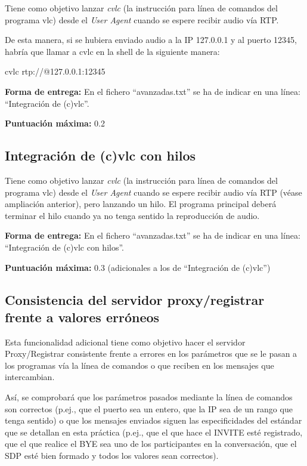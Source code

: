 \documentclass[a4paper,11pt]{article}
\begin{document}
Tiene como objetivo lanzar \emph{cvlc} (la instrucción para línea de comandos del programa vlc) desde el \emph{User Agent} cuando se espere recibir audio vía RTP.

De esta manera, si se hubiera enviado audio a la IP 127.0.0.1 y al puerto 12345, habría que llamar a cvlc en la shell de la siguiente manera:

cvlc rtp://@127.0.0.1:12345

  {\bf Forma de entrega:} En el fichero ``avanzadas.txt'' se ha de indicar en una línea: ``Integración de (c)vlc''.

  {\bf Puntuación máxima:} 0.2

\subsection*{Integración de (c)vlc con hilos}

Tiene como objetivo lanzar \emph{cvlc} (la instrucción para línea de comandos del programa vlc) desde el \emph{User Agent} cuando se espere recibir audio vía RTP (véase ampliación anterior), pero lanzando un hilo. El programa principal deberá terminar el hilo cuando ya no tenga sentido la reproducción de audio.

  {\bf Forma de entrega:} En el fichero ``avanzadas.txt'' se ha de indicar en una línea: ``Integración de (c)vlc con hilos''.

  {\bf Puntuación máxima:} 0.3 (adicionales a los de ``Integración de (c)vlc'')


\subsection*{Consistencia del servidor proxy/registrar frente a valores erróneos}

Esta funcionalidad adicional tiene como objetivo hacer el servidor Proxy/Registrar consistente frente a errores en los parámetros que se le pasan a los programas vía la línea de comandos o que reciben en los mensajes que intercambian. 

Así, se comprobará que los parámetros pasados mediante la línea de comandos son correctos (p.ej., que el puerto sea un entero, que la IP sea de un rango que tenga sentido) o que los mensajes enviados siguen las especificidades del estándar que se detallan en esta práctica (p.ej., que el que hace el INVITE esté registrado, que el que realice el BYE sea uno de los participantes en la conversación, que el SDP esté bien formado y todos los valores sean correctos).
\end{document}
